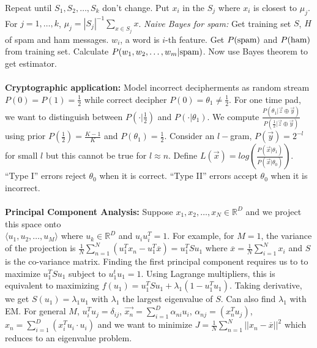 Repeat until $S_1 , S_2 , \ldots , S_k$ don't change.  Put $x_i$ in the 
$S_j$ where $x_i$ is closest to $\mu_j$.  For $j= 1, \ldots, k$,
$\mu_j= |S_j|^{-1} \sum_{x \in S_j} x$. \emph{Naive Bayes for spam:} Get training set
$S$, $H$ of spam and ham messages.  $w_i$, a word is $i$-th feature.  Get 
$P(\textnormal{spam})$ and $P(\textnormal{ham})$ from training set.  
Calculate $P(w_1, w_2, \ldots, w_m|\textnormal{spam})$.  Now use Bayes theorem to get
estimator.
\\
\\
{\bf Cryptographic application:}
Model incorrect decipherments as random stream $P(0)=P(1)= {\frac 1 2}$ while correct decipher
$P(0)=\theta_1 \ne  {\frac 1 2}$.  For one time pad, we want to distinguish between
$P(\cdot | {\frac 1 2})$ and
$P(\cdot | \theta_1)$.  We compute 
${\frac 
{P(\theta_1| {\vec z} \oplus {\vec y})}
{P( {\frac 1 2} | {\vec z} \oplus {\vec y})}}$ using prior 
$P({\frac 1 2})= {\frac {K-1} {K}}$ and
$P(\theta_1)= {\frac 1 2}$.  
Consider an $l-$gram, $P({\vec y})= 2^{-l}$ for small $l$ but this cannot be true for
$l \approx n$.  Define
$L({\vec x})= log({\frac {P({\vec x}|\theta_1)} {P({\vec x}|\theta_0)}})$.  
``Type I'' errors reject $\theta_0$ when it is correct.
``Type II'' errors accept $\theta_0$ when it is incorrect.
\\
\\
{\bf Principal Component Analysis:}
Suppose $x_1 , x_2 , \ldots , x_N \in {\mathbb R}^D$ and
we project this space onto\\
$\langle u_1 , u_2, \ldots , u_M \rangle$ where $u_k \in {\mathbb R}^D$
and $u_i u_i^T =1$.  For example, for $M=1$, the
variance of the projection is
${\frac 1 N} \sum_{n=1}^N (u_1^T x_n -u_1^T {\overline x})= u_1^T S u_1$ where
${\overline x} = {\frac 1 N} \sum_{i=1}^N x_i$ and $S$ is the co-variance matrix.  
Finding the first principal component requires us to
to maximize $u_1^T S u_1$ subject to  $u_1^t u_1 =1$.  Using Lagrange multipliers,
this is equivalent to maximizing $f(u_1)= u_1^T S u_1 + \lambda_1 (1- u_1^T u_1)$.  Taking
derivative, we get $S(u_1) = \lambda_1 u_1$ with $\lambda_1$ the largest eigenvalue
of $S$.  Can also find $\lambda_1$ with EM.  For general $M$,
$u_i^T u_j= \delta_{ij}$, ${\vec {x_n}}= \sum_{i=1}^D \alpha_{ni} u_i$,
$\alpha_{nj}= (x_n^T u_j)$, 
$x_n= \sum_{i=1}^D (x_i^Tu_i \cdot u_i)$ and
we want to minimize $J= {\frac 1 N} \sum_{n=1}^N ||x_n-{\overline x}||^2$
which reduces to an eigenvalue problem.
